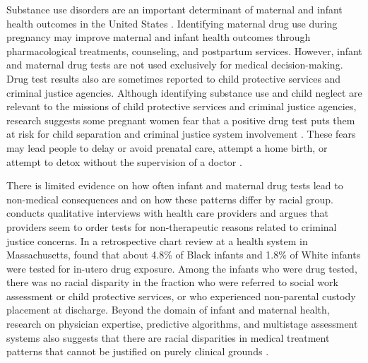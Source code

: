 Substance use disorders are an important determinant of maternal and infant health outcomes in the United States \citep{jarlenski2020substance, clemans2019pregnant}. Identifying maternal drug use during pregnancy may improve maternal and infant health outcomes through pharmacological treatments, counseling, and postpartum services. However, infant and maternal drug tests are not used exclusively for medical decision-making. Drug test results also are sometimes reported to child protective services and criminal justice agencies. Although identifying substance use and child neglect are relevant to the missions of child protective services and criminal justice agencies, research suggests some pregnant women fear that a positive drug test puts them at risk for child separation and criminal justice system involvement \citep{roberts2011complex}. These fears may lead people to delay or avoid prenatal care, attempt a home birth, or attempt to detox without the supervision of a doctor \citep{stone2015pregnant, slaughter2019skin}.

There is limited evidence on how often infant and maternal drug tests lead to non-medical consequences and on how these patterns differ by racial group. \citet{mccabe2022criminalization} conducts qualitative interviews with health care providers and argues that providers seem to order tests for non-therapeutic reasons related to criminal justice concerns. In a retrospective chart review at a health system in Massachusetts, \citet{cohen2023disparities} found that about 4.8\% of Black infants and 1.8\% of White infants were tested for in-utero drug exposure. Among the infants who were drug tested, there was no racial disparity in the fraction who were referred to social work assessment or child protective services, or who experienced non-parental custody placement at discharge. Beyond the domain of infant and maternal health, research on physician expertise, predictive algorithms, and multistage assessment systems also suggests that there are racial disparities in medical treatment patterns that cannot be justified on purely clinical grounds \citep{currie2017diagnosing, obermeyer2019dissecting, baron2024discrimination}.

